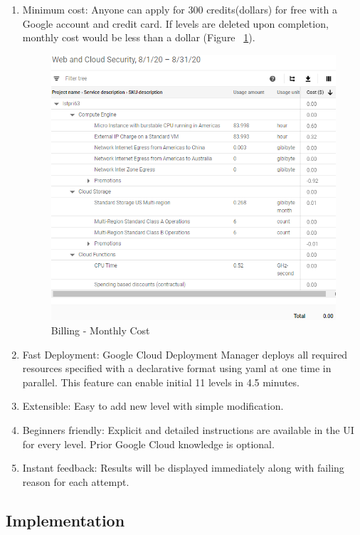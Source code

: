 \documentclass[sigconf]{acmart}
\begin{document}
\begin{enumerate}
\item Minimum cost: Anyone can apply for 300 credits(dollars) for free with a Google account and credit card. If levels are deleted upon completion, monthly cost would be less than a dollar (Figure ~\ref{fig:cost}). 
\begin{figure}[!h]
  \centering
  \includegraphics[width=\linewidth]{pic/cost}
  \caption {Billing - Monthly Cost}
  \label{fig:cost}
\end{figure}
\item Fast Deployment: Google Cloud Deployment Manager deploys all required resources specified with a declarative format using yaml at one time in parallel. This feature can enable initial 11 levels in 4.5 minutes.
\item Extensible: Easy to add new level with simple modification. 
\item Beginners friendly: Explicit and detailed instructions are available in the UI for every level. Prior Google Cloud knowledge is optional.
\item Instant feedback: Results will be displayed immediately along with failing reason for each attempt.

\end{enumerate}

\subsection{Implementation}
\end{document}
